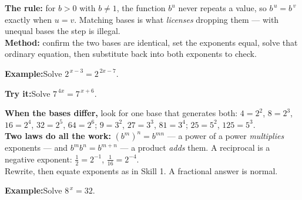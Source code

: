 \documentclass[12pt]{article}
\begin{document}


\begin{formulabox}
\textbf{The rule:} for $b > 0$ with $b \neq 1$, the function $b^{u}$ never repeats
a value, so $b^{\,u} = b^{\,v}$ exactly when $u = v$. Matching bases is what
\emph{licenses} dropping them --- with unequal bases the step is illegal.\\[3pt]
\textbf{Method:} confirm the two bases are identical, set the exponents equal,
solve that ordinary equation, then substitute back into both exponents to check.
\end{formulabox}

\begin{examplebox}
\textbf{Example:}\quad Solve $2^{\,x-3} = 2^{\,2x-7}$.
\end{examplebox}

\begin{tryitbox}
\textbf{Try it:}\quad Solve $7^{\,4x} = 7^{\,x+6}$.\\[2pt]
\end{tryitbox}


\begin{formulabox}
\textbf{When the bases differ,} look for one base that generates both:
$4 = 2^{2}$, $8 = 2^{3}$, $16 = 2^{4}$, $32 = 2^{5}$, $64 = 2^{6}$;
$9 = 3^{2}$, $27 = 3^{3}$, $81 = 3^{4}$; $25 = 5^{2}$, $125 = 5^{3}$.\\[3pt]
\textbf{Two laws do all the work:} $(b^{m})^{n} = b^{mn}$ --- a power of a power
\emph{multiplies} exponents --- and $b^{m}b^{n} = b^{m+n}$ --- a product
\emph{adds} them. A reciprocal is a negative exponent:
$\tfrac{1}{2} = 2^{-1}$, $\tfrac{1}{16} = 2^{-4}$.\\[3pt]
Rewrite, then equate exponents as in Skill 1. A fractional answer is normal.
\end{formulabox}

\begin{examplebox}
\textbf{Example:}\quad Solve $8^{\,x} = 32$.
\end{examplebox}
\end{document}

